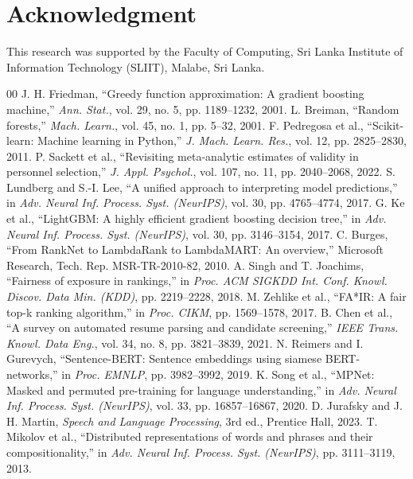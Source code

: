 \documentclass[conference]{IEEEtran}
\begin{document}
\section*{Acknowledgment}
This research was supported by the Faculty of Computing, Sri Lanka Institute of Information Technology (SLIIT), Malabe, Sri Lanka.

\begin{thebibliography}{00}
 J. H. Friedman, ``Greedy function approximation: A gradient boosting machine,'' \textit{Ann. Stat.}, vol. 29, no. 5, pp. 1189--1232, 2001.
 L. Breiman, ``Random forests,'' \textit{Mach. Learn.}, vol. 45, no. 1, pp. 5--32, 2001.
 F. Pedregosa et al., ``Scikit-learn: Machine learning in Python,'' \textit{J. Mach. Learn. Res.}, vol. 12, pp. 2825--2830, 2011.
 P. Sackett et al., ``Revisiting meta-analytic estimates of validity in personnel selection,'' \textit{J. Appl. Psychol.}, vol. 107, no. 11, pp. 2040--2068, 2022.
 S. Lundberg and S.-I. Lee, ``A unified approach to interpreting model predictions,'' in \textit{Adv. Neural Inf. Process. Syst. (NeurIPS)}, vol. 30, pp. 4765--4774, 2017.
 G. Ke et al., ``LightGBM: A highly efficient gradient boosting decision tree,'' in \textit{Adv. Neural Inf. Process. Syst. (NeurIPS)}, vol. 30, pp. 3146--3154, 2017.
 C. Burges, ``From RankNet to LambdaRank to LambdaMART: An overview,'' Microsoft Research, Tech. Rep. MSR-TR-2010-82, 2010.
 A. Singh and T. Joachims, ``Fairness of exposure in rankings,'' in \textit{Proc. ACM SIGKDD Int. Conf. Knowl. Discov. Data Min. (KDD)}, pp. 2219--2228, 2018.
 M. Zehlike et al., ``FA*IR: A fair top-k ranking algorithm,'' in \textit{Proc. CIKM}, pp. 1569--1578, 2017.
 B. Chen et al., ``A survey on automated resume parsing and candidate screening,'' \textit{IEEE Trans. Knowl. Data Eng.}, vol. 34, no. 8, pp. 3821--3839, 2021.
 N. Reimers and I. Gurevych, ``Sentence-BERT: Sentence embeddings using siamese BERT-networks,'' in \textit{Proc. EMNLP}, pp. 3982--3992, 2019.
 K. Song et al., ``MPNet: Masked and permuted pre-training for language understanding,'' in \textit{Adv. Neural Inf. Process. Syst. (NeurIPS)}, vol. 33, pp. 16857--16867, 2020.
 D. Jurafsky and J. H. Martin, \textit{Speech and Language Processing}, 3rd ed., Prentice Hall, 2023.
 T. Mikolov et al., ``Distributed representations of words and phrases and their compositionality,'' in \textit{Adv. Neural Inf. Process. Syst. (NeurIPS)}, pp. 3111--3119, 2013.

\end{thebibliography}
\end{document}
